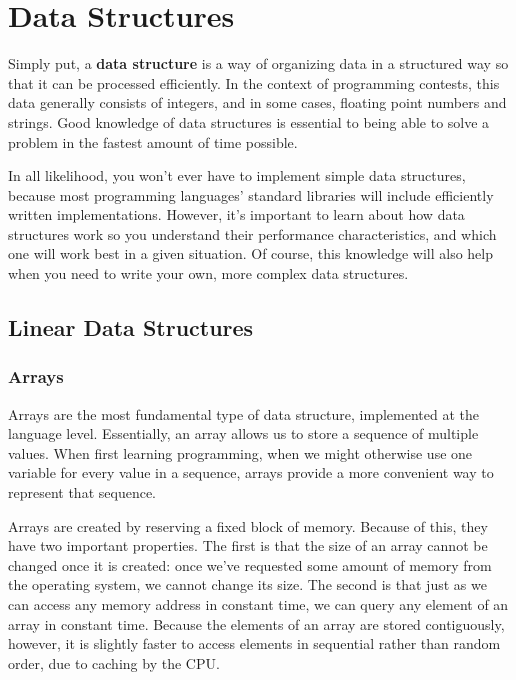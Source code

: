 \chapter{Data Structures}

Simply put, a \textbf{data structure} is a way of organizing data in a structured way so that it can be processed efficiently. In the context of programming contests, this data generally consists of integers, and in some cases, floating point numbers and strings. Good knowledge of data structures is essential to being able to solve a problem in the fastest amount of time possible.

In all likelihood, you won't ever have to implement simple data structures, because most programming languages' standard libraries will include efficiently written implementations. However, it's important to learn about how data structures work so you understand their performance characteristics, and which one will work best in a given situation. Of course, this knowledge will also help when you need to write your own, more complex data structures.


\section{Linear Data Structures}

\subsection{Arrays}

Arrays are the most fundamental type of data structure, implemented at the language level. Essentially, an array allows us to store a sequence of multiple values. When first learning programming, when we might otherwise use one variable for every value in a sequence, arrays provide a more convenient way to represent that sequence.

Arrays are created by reserving a fixed block of memory. Because of this, they have two important properties. The first is that the size of an array cannot be changed once it is created: once we've requested some amount of memory from the operating system, we cannot change its size. The second is that just as we can access any memory address in constant time, we can query any element of an array in constant time. Because the elements of an array are stored contiguously, however, it is slightly faster to access elements in sequential rather than random order, due to caching by the CPU.

